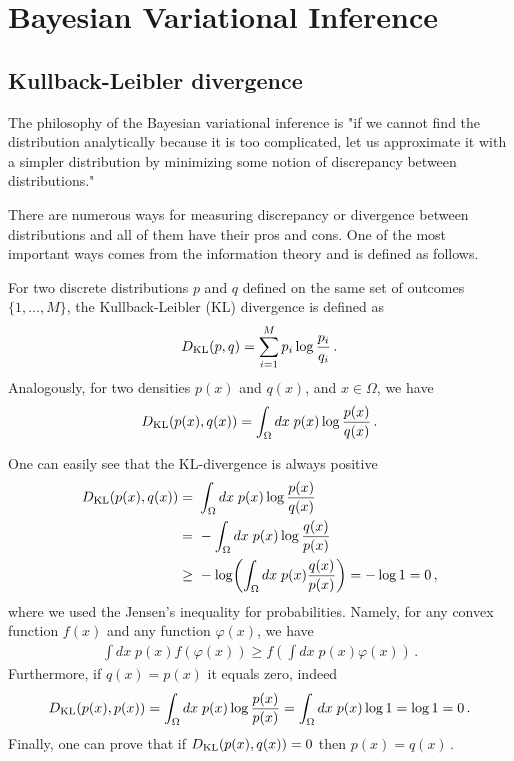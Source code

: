 \section{Bayesian Variational Inference}
\label{sec:var_inference}

\subsection{Kullback-Leibler divergence}
The philosophy of the Bayesian variational inference is "if we cannot find the distribution analytically because it is too complicated, let us approximate it with a simpler distribution by minimizing some notion of discrepancy between distributions."

There are numerous ways for measuring discrepancy or divergence between distributions and all of them have their pros and cons. 
One of the most important ways comes from the information theory and is defined as follows.
\begin{mybox}
\begin{definition}\label{def:kl_div}
    For two discrete distributions $p$ and $q$ defined on the same set of outcomes $\{1,\ldots,M\}$, the Kullback-Leibler (KL) divergence is defined as
    \begin{align}
        D_{\mathrm{KL}}(p,q) = \sum_{i=1}^M p_i \log \frac{p_i}{q_i}\,.
    \end{align}
    Analogously, for two densities $p(x)$ and $q(x)$, and $x \in \Omega$, we have
    \begin{align}
        D_{\mathrm{KL}}(p(x),q(x)) = \int_\Omega dx\; p(x)\log \frac{p(x)}{q(x)}\,.
    \end{align}
\end{definition}    
\end{mybox}

One can easily see that the KL-divergence is always positive
\begin{align}
    \KL(p(x),q(x)) =~& \int_\Omega dx\; p(x)\log \frac{p(x)}{q(x)}\\
    =~& -\int_\Omega dx\; p(x)\log \frac{q(x)}{p(x)}\\
    \geq~& -\log\left(\int_\Omega dx\; p(x) \frac{q(x)}{p(x)}\right) = -\log 1 = 0\,,
\end{align}
where we used the Jensen's inequality for probabilities.
Namely, for any convex function $f(x)$ and any function $\varphi(x)$, we have
\begin{align}
    \int dx\; p(x) f(\varphi(x)) \geq f\left(\int dx\; p(x)\varphi(x)\right)\,.
\end{align}
Furthermore, if $q(x) = p(x)$ it equals zero, indeed
\begin{align}
    D_{\mathrm{KL}}(p(x),p(x)) = \int_\Omega dx\; p(x)\log \frac{p(x)}{p(x)} = \int_\Omega dx\; p(x)\log 1 = \log 1 = 0\,.
\end{align}
Finally, one can prove that if $D_{\mathrm{KL}}(p(x),q(x)) = 0$ then $p(x) = q(x)$\,.

